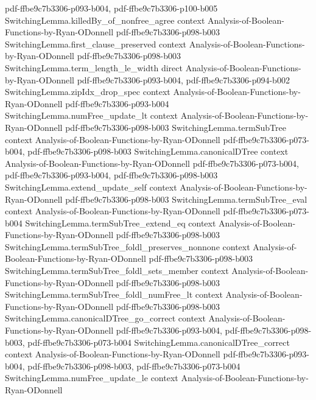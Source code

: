 \begin{theorem}
  {pdf-ffbe9c7b3306-p093-b004,
    pdf-ffbe9c7b3306-p100-b005}
\proofstep
  {SwitchingLemma.killedBy_of_nonfree_agree}
  {context}
  {Analysis-of-Boolean-Functions-by-Ryan-ODonnell}
  {pdf-ffbe9c7b3306-p098-b003}
\proofstep
  {SwitchingLemma.first_clause_preserved}
  {context}
  {Analysis-of-Boolean-Functions-by-Ryan-ODonnell}
  {pdf-ffbe9c7b3306-p098-b003}
\proofstep
  {SwitchingLemma.term_length_le_width}
  {direct}
  {Analysis-of-Boolean-Functions-by-Ryan-ODonnell}
  {pdf-ffbe9c7b3306-p093-b004,
    pdf-ffbe9c7b3306-p094-b002}
\proofstep
  {SwitchingLemma.zipIdx_drop_spec}
  {context}
  {Analysis-of-Boolean-Functions-by-Ryan-ODonnell}
  {pdf-ffbe9c7b3306-p093-b004}
\proofstep
  {SwitchingLemma.numFree_update_lt}
  {context}
  {Analysis-of-Boolean-Functions-by-Ryan-ODonnell}
  {pdf-ffbe9c7b3306-p098-b003}
\proofstep
  {SwitchingLemma.termSubTree}
  {context}
  {Analysis-of-Boolean-Functions-by-Ryan-ODonnell}
  {pdf-ffbe9c7b3306-p073-b004,
    pdf-ffbe9c7b3306-p098-b003}
\proofstep
  {SwitchingLemma.canonicalDTree}
  {context}
  {Analysis-of-Boolean-Functions-by-Ryan-ODonnell}
  {pdf-ffbe9c7b3306-p073-b004,
    pdf-ffbe9c7b3306-p093-b004,
    pdf-ffbe9c7b3306-p098-b003}
\proofstep
  {SwitchingLemma.extend_update_self}
  {context}
  {Analysis-of-Boolean-Functions-by-Ryan-ODonnell}
  {pdf-ffbe9c7b3306-p098-b003}
\proofstep
  {SwitchingLemma.termSubTree_eval}
  {context}
  {Analysis-of-Boolean-Functions-by-Ryan-ODonnell}
  {pdf-ffbe9c7b3306-p073-b004}
\proofstep
  {SwitchingLemma.termSubTree_extend_eq}
  {context}
  {Analysis-of-Boolean-Functions-by-Ryan-ODonnell}
  {pdf-ffbe9c7b3306-p098-b003}
\proofstep
  {SwitchingLemma.termSubTree_foldl_preserves_nonnone}
  {context}
  {Analysis-of-Boolean-Functions-by-Ryan-ODonnell}
  {pdf-ffbe9c7b3306-p098-b003}
\proofstep
  {SwitchingLemma.termSubTree_foldl_sets_member}
  {context}
  {Analysis-of-Boolean-Functions-by-Ryan-ODonnell}
  {pdf-ffbe9c7b3306-p098-b003}
\proofstep
  {SwitchingLemma.termSubTree_foldl_numFree_lt}
  {context}
  {Analysis-of-Boolean-Functions-by-Ryan-ODonnell}
  {pdf-ffbe9c7b3306-p098-b003}
\proofstep
  {SwitchingLemma.canonicalDTree_go_correct}
  {context}
  {Analysis-of-Boolean-Functions-by-Ryan-ODonnell}
  {pdf-ffbe9c7b3306-p093-b004,
    pdf-ffbe9c7b3306-p098-b003,
    pdf-ffbe9c7b3306-p073-b004}
\proofstep
  {SwitchingLemma.canonicalDTree_correct}
  {context}
  {Analysis-of-Boolean-Functions-by-Ryan-ODonnell}
  {pdf-ffbe9c7b3306-p093-b004,
    pdf-ffbe9c7b3306-p098-b003,
    pdf-ffbe9c7b3306-p073-b004}
\proofstep
  {SwitchingLemma.numFree_update_le}
  {context}
  {Analysis-of-Boolean-Functions-by-Ryan-ODonnell}

\end{theorem}
